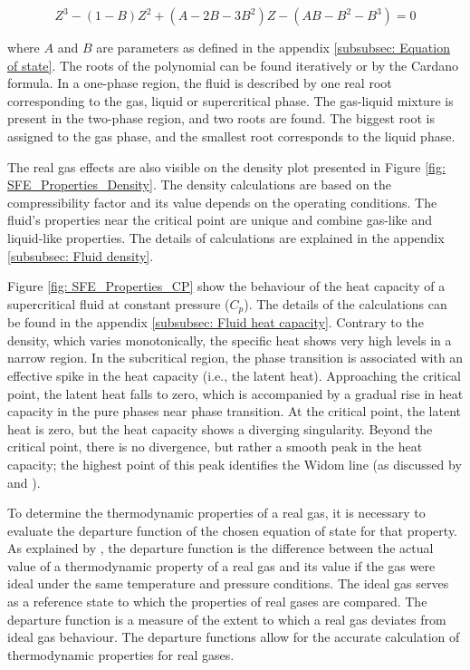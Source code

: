 \documentclass[../Article_Model_Parameters.tex]{subfiles}
\begin{document}
	{\footnotesize
		\begin{equation}
			Z^3 - (1-B)Z^2+(A-2B-3B^2)Z -(AB-B^2-B^3) = 0
			\label{EQ: PR_polynomial}
		\end{equation}
	}
	
	where $A$ and $B$ are parameters as defined in the appendix \ref{subsubsec: Equation of state}. The roots of the polynomial can be found iteratively or by the Cardano formula. In a one-phase region, the fluid is described by one real root corresponding to the gas, liquid or supercritical phase. The gas-liquid mixture is present in the two-phase region, and two roots are found. The biggest root is assigned to the gas phase, and the smallest root corresponds to the liquid phase.
	
	The real gas effects are also visible on the density plot presented in Figure \ref{fig: SFE_Properties_Density}. The density calculations are based on the compressibility factor and its value depends on the operating conditions. The fluid's properties near the critical point are unique and combine gas-like and liquid-like properties. The details of calculations are explained in the appendix \ref{subsubsec: Fluid density}.
	
	Figure \ref{fig: SFE_Properties_CP} show the behaviour of the heat capacity of a supercritical fluid at constant pressure ($C_p$). The details of the calculations can be found in the appendix \ref{subsubsec: Fluid heat capacity}. Contrary to the density, which varies monotonically, the specific heat shows very high levels in a narrow region. In the subcritical region, the phase transition is associated with an effective spike in the heat capacity (i.e., the latent heat). Approaching the critical point, the latent heat falls to zero, which is accompanied by a gradual rise in heat capacity in the pure phases near phase transition. At the critical point, the latent heat is zero, but the heat capacity shows a diverging singularity. Beyond the critical point, there is no divergence, but rather a smooth peak in the heat capacity; the highest point of this peak identifies the Widom line (as discussed by \citet{Simeoni2010} and \citet{Banuti2019}).
	
	To determine the thermodynamic properties of a real gas, it is necessary to evaluate the departure function of the chosen equation of state for that property. As explained by \citet{Elliott2011}, the departure function is the difference between the actual value of a thermodynamic property of a real gas and its value if the gas were ideal under the same temperature and pressure conditions. The ideal gas serves as a reference state to which the properties of real gases are compared. The departure function is a measure of the extent to which a real gas deviates from ideal gas behaviour. The departure functions allow for the accurate calculation of thermodynamic properties for real gases.  %
	
\end{document}
